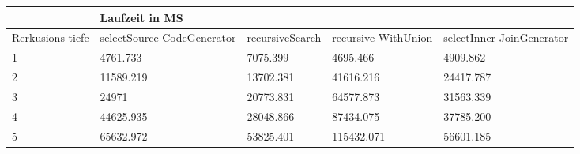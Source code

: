 \begin{table}[H]
	\begin{tabular}{l|l|l|l|l|l|}
		\cline{2-6}
		& \multicolumn{5}{|l|}{Laufzeit in MS}                                                                                                                                                  \\ \hline
		\multicolumn{1}{|l|}{\multirow{2}{2cm}{Rerkusions-tiefe}} & \multicolumn{2}{|l|}{\multirow{2}{3cm}{selectSource CodeGenerator}} & \multirow{2}{2.8cm}{recursiveSearch} & \multirow{2}{2.5cm}{recursive WithUnion} & \multirow{2}{2.5cm}{selectInner JoinGenerator} \\
		\multicolumn{1}{|l|}{}
		& \multicolumn{2}{|l|}{}                                           &                                  &                                     &                                           \\ \hline
		\multicolumn{1}{|l|}{1}                                 & \multicolumn{2}{l|}{4761.733}                                    & 7075.399                                              & 4695.466                                                  & 4909.862                                                        \\ \hline
		\multicolumn{1}{|l|}{2}                                 & \multicolumn{2}{l|}{11589.219}                                   & 13702.381                                             & 41616.216                                                 & 24417.787                                                       \\ \hline
		\multicolumn{1}{|l|}{3}                                 & \multicolumn{2}{l|}{24971}                                       & 20773.831                                             & 64577.873                                                 & 31563.339                                                       \\ \hline
		\multicolumn{1}{|l|}{4}                                 & \multicolumn{2}{l|}{44625.935}                                   & 28048.866                                             & 87434.075                                                 & 37785.200                                                       \\ \hline
		\multicolumn{1}{|l|}{5}                                 & \multicolumn{2}{l|}{65632.972}                                   & 53825.401                                             & 115432.071                                                & 56601.185                                                       \\ \hline
		
	\end{tabular}
\end{table}


